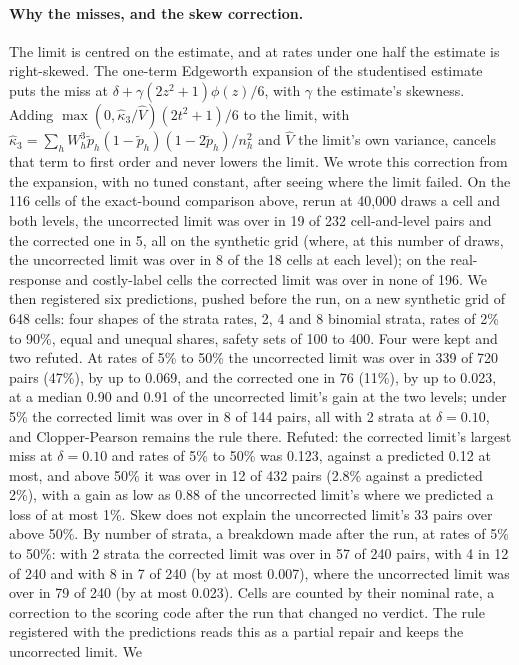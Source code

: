 \paragraph{Why the \SWT{} misses, and the skew correction.}\label{app:skew} The limit is centred on the estimate, and at
rates under one half the estimate is right-skewed. The one-term Edgeworth expansion of the studentised estimate
\citep{hall1992,johnson1978} puts the miss at $\delta+\gamma(2z^2+1)\phi(z)/6$, with $\gamma$ the estimate's skewness.
Adding $\max(0,\hat\kappa_3/\hat V)(2t^2+1)/6$ to the limit, with
$\hat\kappa_3=\sum_hW_h^3\tilde p_h(1-\tilde p_h)(1-2\tilde p_h)/n_h^2$ and $\hat V$ the limit's own variance, cancels
that term to first order and never lowers the limit. We wrote this correction from the expansion, with no tuned constant, after seeing
where the limit failed. On the 116 cells of the exact-bound comparison above, rerun at 40,000 draws a cell and both
levels, the uncorrected limit was over in 19 of 232 cell-and-level pairs and the corrected one in 5, all on the
synthetic grid (where, at this number of draws, the uncorrected limit was over in 8 of the 18 cells at each level); on the real-response and costly-label cells the corrected limit was over in none of 196. We then
registered six predictions, pushed before the run, on a new synthetic grid of 648 cells: four shapes of the strata
rates, 2, 4 and 8 binomial strata, rates of 2\% to 90\%, equal and unequal shares, safety sets of 100 to 400. Four were
kept and two refuted. At rates of 5\% to 50\% the uncorrected limit was over in 339 of 720 pairs (47\%), by up to 0.069,
and the corrected one in 76 (11\%), by up to 0.023, at a median 0.90 and 0.91 of the uncorrected limit's gain at the two
levels; under 5\% the corrected limit was over in 8 of 144 pairs, all with 2 strata at $\delta=0.10$, and Clopper-Pearson remains the rule there. Refuted: the corrected limit's largest miss at
$\delta=0.10$ and rates of 5\% to 50\% was 0.123, against a predicted 0.12 at most, and above 50\% it was over in 12 of
432 pairs (2.8\% against a predicted 2\%), with a gain as low as 0.88 of the uncorrected limit's where we predicted a loss of at most 1\%. Skew does not explain the uncorrected limit's 33 pairs over above 50\%. By number of strata, a breakdown made after the run, at rates of 5\% to 50\%: with 2 strata the corrected limit
was over in 57 of 240 pairs, with 4 in 12 of 240 and with 8 in 7 of 240 (by at most 0.007), where the uncorrected limit
was over in 79 of 240 (by at most 0.023). Cells are counted by their nominal rate, a correction to the scoring code after the run that changed no verdict. The rule registered with the predictions reads this as a partial repair and keeps the uncorrected limit. We
